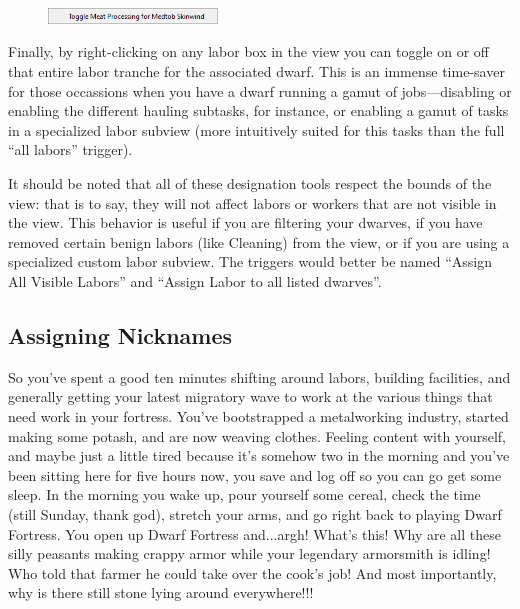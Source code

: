 \documentclass[]{article}
\begin{document}
\begin{figure}
\vspace{-20pt}
  \begin{center}
    \includegraphics[width=0.4\textwidth]{Sec2Fig5-4}
  \end{center}
\vspace{-10pt}
\end{figure}
Finally, by right-clicking on any labor box in the view you can toggle on or off that entire labor
tranche for the associated dwarf. This is an immense time-saver for those occassions when you have a
dwarf running a gamut of jobs---disabling or enabling the different hauling subtasks, for instance, or
enabling a gamut of tasks in a specialized labor subview (more intuitively suited for this tasks than
the full ``all labors'' trigger).

It should be noted that all of these designation tools respect the bounds of the view: that is to say,
they will not affect labors or workers that are not visible in the view. This behavior is useful if you
are filtering your dwarves, if you have removed certain benign labors (like Cleaning) from the view, or
if you are using a specialized custom labor subview. The triggers would better be named ``Assign All
Visible Labors'' and ``Assign Labor to all listed dwarves''.

\newpage
\subsection{Assigning Nicknames}
\label{sec:Assigning Nicknames}

So you've spent a good ten minutes shifting around labors, building facilities, and generally getting
your latest migratory wave to work at the various things that need work in your fortress. You've
bootstrapped a metalworking industry, started making some potash, and are now weaving clothes. Feeling
content with yourself, and maybe just a little tired because it's somehow two in the morning and you've
been sitting here for five hours now, you save and log off so you can go get some sleep. In the morning
you wake up, pour yourself some cereal, check the time (still Sunday, thank god), stretch your arms, and
go right back to playing Dwarf Fortress. You open up Dwarf Fortress and...argh! What's this! Why are all
these silly peasants making crappy armor while your legendary armorsmith is idling! Who told that farmer
he could take over the cook's job! And most importantly, why is there still stone lying around
everywhere!!!
\end{document}
